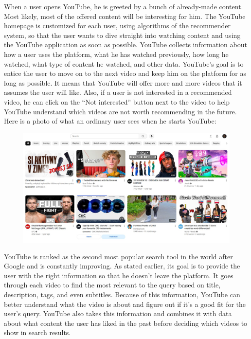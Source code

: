 \documentclass[12pt]{article}
\begin{document}
When a user opens YouTube, he is greeted by a bunch of already-made content. Most likely, most of the offered content will be interesting for him. The YouTube homepage is customized for each user, using algorithms of the recommender system, so that the user wants to dive straight into watching content and using the YouTube application as soon as possible. YouTube collects information about how a user uses the platform, what he has watched previously, how long he watched, what type of content he watched, and other data. 
YouTube's goal is to entice the user to move on to the next video and keep him on the platform for as long as possible. It means that YouTube will offer more and more videos that it assumes the user will like. Also, if a user is not interested in a recommended video, he can click on the “Not interested” button next to the video to help YouTube understand which videos are not worth recommending in the future. Here is a photo of what an ordinary user sees when he starts YouTube:

\begin{figure}[H]  %
    \centering     %
    \includegraphics[width=1\textwidth]{image2.png}
\end{figure}

YouTube is ranked as the second most popular search tool in the world after Google and is constantly improving. As stated earlier, its goal is to provide the user with the right information so that he doesn't leave the platform. It goes through each video to find the most relevant to the query based on title, description, tags, and even subtitles. Because of this information, YouTube can better understand what the video is about and figure out if it's a good fit for the user's query. YouTube also takes this information and combines it with data about what content the user has liked in the past before deciding which videos to show in search results.
\cite{3.2}
\end{document}
